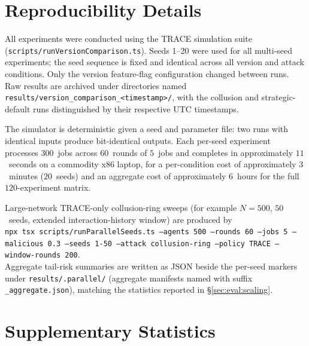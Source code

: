 \documentclass[sigconf,nonacm,10pt]{acmart}
\begin{document}
\clearpage
\appendix
\raggedbottom

\section{Reproducibility Details}
\label{app:repro}

All experiments were conducted using the TRACE simulation suite
(\texttt{scripts/runVersion\-Comparison.ts}). Seeds 1--20 were
used for all multi-seed experiments; the seed sequence is fixed
and identical across all version and attack conditions. Only the
version feature-flag configuration changed between runs. Raw
results are archived under directories named
\texttt{results/version\_compari\-son\_<timestamp>/}, with the
collusion and strategic-default runs distinguished by their
respective UTC timestamps.

The simulator is deterministic given a seed and parameter file:
two runs with identical inputs produce bit-identical outputs.
Each per-seed experiment processes $300$~jobs across $60$~rounds
of $5$~jobs and completes in approximately $11$~seconds on a
commodity x86 laptop, for a per-condition cost of approximately
$3$~minutes ($20$~seeds) and an aggregate cost of approximately
$6$~hours for the full $120$-experiment matrix.

\noindent Large-network TRACE-only collusion-ring sweeps (for
example $N{=}500$, $50$~seeds, extended interaction-history
window) are produced by\\
{\small\texttt{npx tsx scripts/run\-Parallel\-Seeds.ts --agents 500 --rounds 60 --jobs 5 --malicious 0.3 --seeds 1-50 --attack collusion-ring --policy TRACE --window-rounds 200}}.\\
Aggregate tail-risk summaries are written as JSON beside the
per-seed markers under \texttt{results/.parallel/} (aggregate
manifests named with suffix \texttt{\_aggregate.json}), matching the
statistics reported in \S\ref{sec:eval:scaling}.

\section{Supplementary Statistics}
\label{app:stats}
\end{document}
